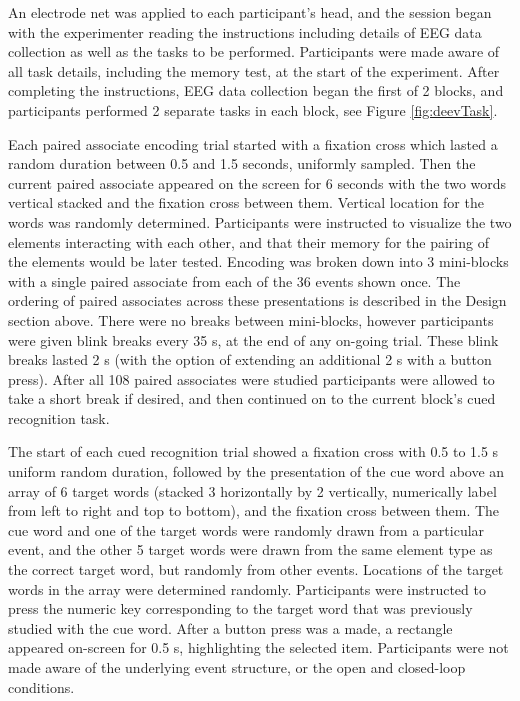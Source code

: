 \documentclass[11pt, titlepage, twoside]{article}
\begin{document}
An electrode net was applied to each participant's head, and the session began with the experimenter reading the instructions including details of EEG data collection as well as the tasks to be performed.  Participants were made aware of all task details, including the memory test, at the start of the experiment.  After completing the instructions, EEG data collection began the first of 2 blocks, and participants performed 2 separate tasks in each block, see Figure \ref{fig:deevTask}. 

Each paired associate encoding trial started with a fixation cross which lasted a random duration between 0.5 and 1.5 seconds, uniformly sampled.  Then the current paired associate appeared on the screen for 6 seconds with the two words vertical stacked and the fixation cross between them. Vertical location for the words was randomly determined.  Participants were instructed to visualize the two elements interacting with each other, and that their memory for the pairing of the elements would be later tested.   Encoding was broken down into 3 mini-blocks with a single paired associate from each of the 36 events shown once.  The ordering of paired associates across these presentations is described in the Design section above.  There were no breaks between mini-blocks, however participants were given blink breaks every 35 s, at the end of any on-going trial.  These blink breaks lasted 2 s (with the option of extending an additional 2 s with a button press).  After all 108 paired associates were studied participants were allowed to take a short break if desired, and then continued on to the current block's cued recognition task.

The start of each cued recognition trial showed a fixation cross with 0.5 to 1.5 s uniform random duration, followed by the presentation of the cue word above an array of 6 target words (stacked 3 horizontally by 2 vertically, numerically label from left to right and top to bottom), and the fixation cross between them.  The cue word and one of the target words were randomly drawn from a particular event, and the other 5 target words were drawn from the same element type as the correct target word, but randomly from other events.  Locations of the target words in the array were determined randomly.  Participants were instructed to press the numeric key corresponding to the target word that was previously studied with the cue word.  After a button press was a made, a rectangle appeared on-screen for 0.5 s, highlighting the selected item.  Participants were not made aware of the underlying event structure, or the open and closed-loop conditions.
\end{document}
